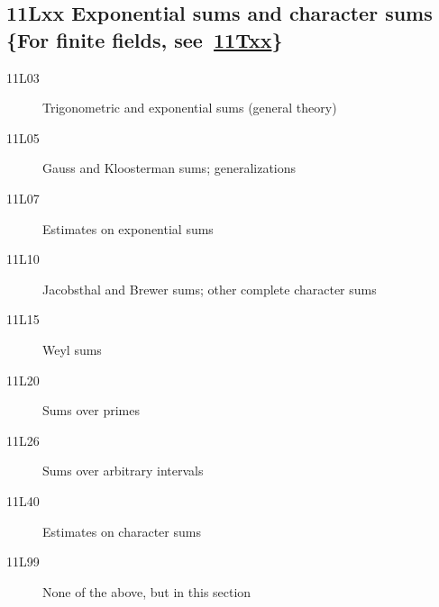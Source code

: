 \documentclass[letterpaper]{article}
\begin{document}
\subsection*{11Lxx  Exponential sums and character sums \{For finite fields, see~\hyperref[11Txx]{11Txx}\}}\label{11Lxx}
\begin{description}  
\item [11L03]\label{11L03} Trigonometric and exponential sums (general theory)
\item [11L05]\label{11L05} Gauss and Kloosterman sums; generalizations
\item [11L07]\label{11L07} Estimates on exponential sums
\item [11L10]\label{11L10} Jacobsthal and Brewer sums; other complete character sums
\item [11L15]\label{11L15} Weyl sums
\item [11L20]\label{11L20} Sums over primes
\item [11L26]\label{11L26} Sums over arbitrary intervals
\item [11L40]\label{11L40} Estimates on character sums
\item [11L99]\label{11L99} None of the above, but in this section
\end{description}
\end{document}
